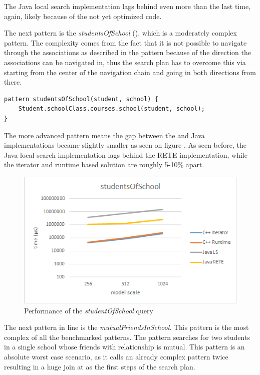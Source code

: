 The Java local search implementation lags behind even more than the last time,
again, likely because of the not yet optimized code.

The next pattern is the \emph{studentsOfSchool}
(), which is a moderately complex pattern. The
complexity comes from the fact that it is not possible to navigate through the
associations as described in the pattern because of the direction the
associations can be navigated in, thus the search plan has to overcome this via
starting from the center of the navigation chain and going in both directions
from there.

\begin{lstlisting}[frame=single,float=!ht,language=IQPL,
label=listing:meas_studentOfSchool, caption=The studentOfSchool pattern]
pattern studentsOfSchool(student, school) {
	Student.schoolClass.courses.school(student, school);
}
\end{lstlisting}

The more advanced pattern means the gap between the \CPP{} and Java
implementations became slightly smaller as seen on figure
. As seen before, the Java local search
implementation lags behind the RETE implementation, while the \CPP{} iterator
and runtime based solution are roughly 5-10\% apart.

\begin{figure}[!ht]
\centering
\includegraphics[width=120mm,
keepaspectratio]{figures/meas_studentOfSchool.png}
\caption{Performance of the \emph{studentOfSchool} query}
\label{fig:meas_studentOfSchool}
\end{figure}

The next pattern in line is the \emph{mutualFriendsInSchool}. This pattern is
the most complex of all the benchmarked patterns. The pattern searches for
two students in a single school whose friends with relationship is mutual. This
pattern is an absolute worst case scenario, as it calls an already complex
pattern twice resulting in a huge join at as the first steps of the search plan.

